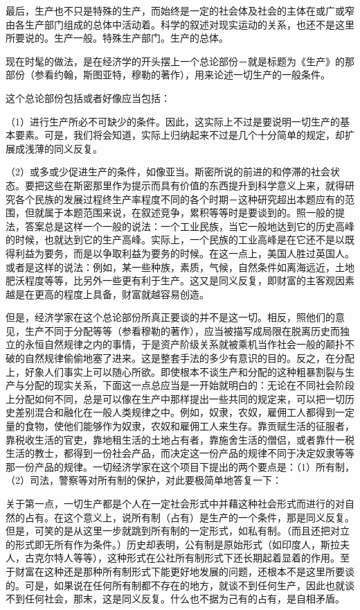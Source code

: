 \documentclass[a4paper,twoside,12pt]{ctexart}
\begin{document}
最后，生产也不只是特殊的生产，而始终是一定的社会体及社会的主体在或广或窄由各生产部门组成的总体中活动着。科学的叙述对现实运动的关系，也还不是这里所要说的。生产一般。特殊生产部门。生产的总体。

现在时髦的做法，是在经济学的开头摆上一个总论部份－就是标题为《生产》的那部份（参看约翰，斯图亚特，穆勒的著作），用来论述一切生产的一般条件。

这个总论部份包括或者好像应当包括：

（1）进行生产所必不可缺少的条件。因此，这实际上不过是要说明一切生产的基本要素。可是，我们将会知道，实际上归纳起来不过是几个十分简单的规定，却扩展成浅薄的同义反复。

（2）或多或少促进生产的条件，如像亚当。斯密所说的前进的和停滞的社会状态。要把这些在斯密那里作为提示而具有价值的东西提升到科学意义上来，就得研究各个民族的发展过程终生产率程度不同的各个时期－这种研究超出本题应有的范围，但就属于本题范围来说，在叙述竞争，累积等等时是要谈到的。照一般的提法，答案总是这样一个一般的说法：一个工业民族，当它一般地达到它的历史高峰的时候，也就达到它的生产高峰。实际上，一个民族的工业高峰是在它还不是以既得利益为要务，而是以争取利益为要务的时候。在这一点上，美国人胜过英国人。或者是这样的说法：例如，某一些种族，素质，气候，自然条件如离海远近，土地肥沃程度等等，比另外一些更有利于生产。这又是同义反复，即财富的主客观因素越是在更高的程度上具备，财富就越容易创造。

但是，经济学家在这个总论部份所真正要谈的并不是这一切。相反，照他们的意见，生产不同于分配等等（参看穆勒的著作），应当被描写成局限在脱离历史而独立的永恒自然规律之内的事情，于是资产阶级关系就被乘机当作社会一般的颠扑不破的自然规律偷偷地塞了进来。这是整套手法的多少有意识的目的。反之，在分配上，好象人们事实上可以随心所欲。即使根本不谈生产和分配的这种粗暴割裂与生产与分配的现实关系，下面这一点总应当是一开始就明白的：无论在不同社会阶段上分配如何不同，总是可以像在生产中那样提出一些共同的规定来，可以把一切历史差别混合和融化在一般人类规律之中。例如，奴隶，农奴，雇佣工人都得到一定量的食物，使他们能够作为奴隶，农奴和雇佣工人来生存。靠贡赋生活的征服者，靠税收生活的官吏，靠地租生活的土地占有者，靠施舍生活的僧侣，或者靠什一税生活的教士，都得到一份社会产品，而决定这一份产品的规律不同于决定奴隶等等那一份产品的规律。一切经济学家在这个项目下提出的两个要点是：（1）所有制，（2）司法，警察等对所有制的保护，对此要极简单地答复一下：

关于第一点，一切生产都是个人在一定社会形式中并藉这种社会形式而进行的对自然的占有。在这个意义上，说所有制（占有）是生产的一个条件，那是同义反复。但是，可笑的是从这里一步就跳到所有制的一定形式，如私有制。（而且还把对立的形式即无所有作为条件。）历史却表明，公有制是原始形式（如印度人，斯拉夫人，古克尔特人等等），这种形式在公社所有制形式下还长期起着显着的作用。至于财富在这种还是那种所有制形式下能更好地发展的问题，还根本不是这里所要谈的。可是，如果说在任何所有制都不存在的地方，就谈不到任何生产，因此也就谈不到任何社会，那末，这是同义反复。什么也不据为己有的占有，是自相矛盾。
\end{document}
